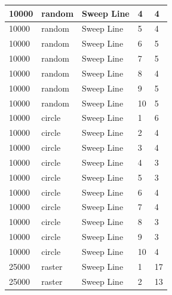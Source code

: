 \documentclass[12pt]{article}
\begin{document}
\begin{longtable}{|l|l|l|l|l|}
10000        & random            & Sweep Line & 4          & 4                             \\ \hline
10000        & random            & Sweep Line & 5          & 4                             \\ \hline
10000        & random            & Sweep Line & 6          & 5                             \\ \hline
10000        & random            & Sweep Line & 7          & 5                             \\ \hline
10000        & random            & Sweep Line & 8          & 4                             \\ \hline
10000        & random            & Sweep Line & 9          & 5                             \\ \hline
10000        & random            & Sweep Line & 10         & 5                             \\ \hline
10000        & circle            & Sweep Line & 1          & 6                             \\ \hline
10000        & circle            & Sweep Line & 2          & 4                             \\ \hline
10000        & circle            & Sweep Line & 3          & 4                             \\ \hline
10000        & circle            & Sweep Line & 4          & 3                             \\ \hline
10000        & circle            & Sweep Line & 5          & 3                             \\ \hline
10000        & circle            & Sweep Line & 6          & 4                             \\ \hline
10000        & circle            & Sweep Line & 7          & 4                             \\ \hline
10000        & circle            & Sweep Line & 8          & 3                             \\ \hline
10000        & circle            & Sweep Line & 9          & 3                             \\ \hline
10000        & circle            & Sweep Line & 10         & 4                             \\ \hline
25000        & raster            & Sweep Line & 1          & 17                            \\ \hline
25000        & raster            & Sweep Line & 2          & 13                            \\ \hline

\end{longtable}
\end{document}

